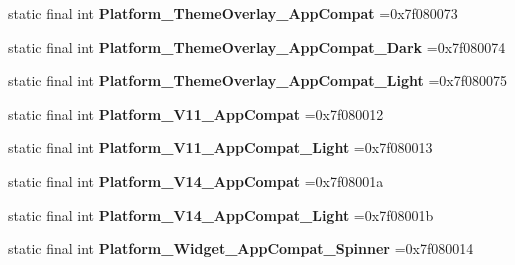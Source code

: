 \begin{DoxyCompactItemize}
\item 
\hypertarget{classcheck_1_1test_1_1_r_1_1style_ab1ce00aa085bc7c3a5aff7d9f169ee66}{}static final int {\bfseries Platform\+\_\+\+Theme\+Overlay\+\_\+\+App\+Compat} =0x7f080073\label{classcheck_1_1test_1_1_r_1_1style_ab1ce00aa085bc7c3a5aff7d9f169ee66}

\item 
\hypertarget{classcheck_1_1test_1_1_r_1_1style_ad685b6130e0aeef1f89b7a6a3f705286}{}static final int {\bfseries Platform\+\_\+\+Theme\+Overlay\+\_\+\+App\+Compat\+\_\+\+Dark} =0x7f080074\label{classcheck_1_1test_1_1_r_1_1style_ad685b6130e0aeef1f89b7a6a3f705286}

\item 
\hypertarget{classcheck_1_1test_1_1_r_1_1style_a5923292584bc19794db255f54a79c917}{}static final int {\bfseries Platform\+\_\+\+Theme\+Overlay\+\_\+\+App\+Compat\+\_\+\+Light} =0x7f080075\label{classcheck_1_1test_1_1_r_1_1style_a5923292584bc19794db255f54a79c917}

\item 
\hypertarget{classcheck_1_1test_1_1_r_1_1style_a7b3b2127f2b45b8b68d0c7eaa8bcfbe3}{}static final int {\bfseries Platform\+\_\+\+V11\+\_\+\+App\+Compat} =0x7f080012\label{classcheck_1_1test_1_1_r_1_1style_a7b3b2127f2b45b8b68d0c7eaa8bcfbe3}

\item 
\hypertarget{classcheck_1_1test_1_1_r_1_1style_ad1949e84f6d584a5e5ba8c689c2eb39f}{}static final int {\bfseries Platform\+\_\+\+V11\+\_\+\+App\+Compat\+\_\+\+Light} =0x7f080013\label{classcheck_1_1test_1_1_r_1_1style_ad1949e84f6d584a5e5ba8c689c2eb39f}

\item 
\hypertarget{classcheck_1_1test_1_1_r_1_1style_a7d2520c0dfedce2f1ac79ee5cef0a455}{}static final int {\bfseries Platform\+\_\+\+V14\+\_\+\+App\+Compat} =0x7f08001a\label{classcheck_1_1test_1_1_r_1_1style_a7d2520c0dfedce2f1ac79ee5cef0a455}

\item 
\hypertarget{classcheck_1_1test_1_1_r_1_1style_aa49e0486a03babe11054b3d0da1f8057}{}static final int {\bfseries Platform\+\_\+\+V14\+\_\+\+App\+Compat\+\_\+\+Light} =0x7f08001b\label{classcheck_1_1test_1_1_r_1_1style_aa49e0486a03babe11054b3d0da1f8057}

\item 
\hypertarget{classcheck_1_1test_1_1_r_1_1style_a4bcfa0162960adf82d953ee9fd2467a6}{}static final int {\bfseries Platform\+\_\+\+Widget\+\_\+\+App\+Compat\+\_\+\+Spinner} =0x7f080014\label{classcheck_1_1test_1_1_r_1_1style_a4bcfa0162960adf82d953ee9fd2467a6}


\end{DoxyCompactItemize}
